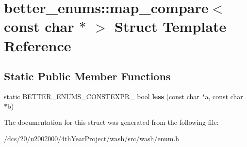 \hypertarget{structbetter__enums_1_1map__compare_3_01const_01char_01_5_01_4}{}\section{better\+\_\+enums\+:\+:map\+\_\+compare$<$ const char $\ast$ $>$ Struct Template Reference}
\label{structbetter__enums_1_1map__compare_3_01const_01char_01_5_01_4}
\subsection*{Static Public Member Functions}
\begin{DoxyCompactItemize}
\item 
\mbox{\label{structbetter__enums_1_1map__compare_3_01const_01char_01_5_01_4_a4ad056e5d61495762399c88344f1ce72}} 
static B\+E\+T\+T\+E\+R\+\_\+\+E\+N\+U\+M\+S\+\_\+\+C\+O\+N\+S\+T\+E\+X\+P\+R\+\_\+ bool {\bfseries less} (const char $\ast$a, const char $\ast$b)
\end{DoxyCompactItemize}


The documentation for this struct was generated from the following file\+:\begin{DoxyCompactItemize}
\item 
/dcs/20/u2002000/4th\+Year\+Project/wash/src/wash/enum.\+h\end{DoxyCompactItemize}
